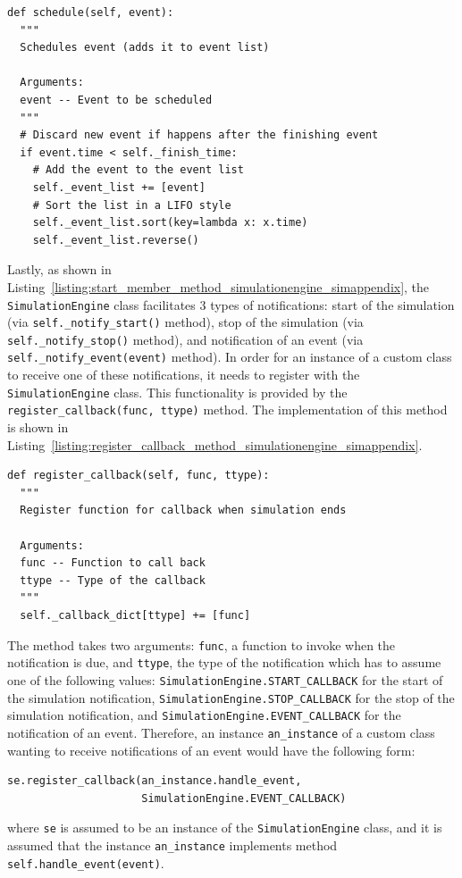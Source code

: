 \begin{lstlisting}[caption=\lstinline{schedule(event)} member method of the \lstinline{SimulationEngine} class, label=listing:schedule_member_method_simulationengine_simappendix]
def schedule(self, event):
  """
  Schedules event (adds it to event list)

  Arguments:
  event -- Event to be scheduled
  """
  # Discard new event if happens after the finishing event
  if event.time < self._finish_time:
    # Add the event to the event list
    self._event_list += [event]
    # Sort the list in a LIFO style
    self._event_list.sort(key=lambda x: x.time)
    self._event_list.reverse()
\end{lstlisting}

Lastly, as shown in Listing~\ref{listing:start_member_method_simulationengine_simappendix}, the \lstinline{SimulationEngine} class facilitates 3 types of notifications: start of the simulation (via \lstinline{self._notify_start()} method), stop of the simulation (via \lstinline{self._notify_stop()} method), and notification of an event (via \lstinline{self._notify_event(event)} method). In order for an instance of a custom class to receive one of these notifications, it needs to register with the \lstinline{SimulationEngine} class. This functionality is provided by the \lstinline{register_callback(func, ttype)} method. The implementation of this method is shown in Listing~\ref{listing:register_callback_method_simulationengine_simappendix}.
\begin{lstlisting}[caption=\lstinline{register_callback(func, ttype)} member method of the \lstinline{SimulationEngine} class, label=listing:register_callback_method_simulationengine_simappendix]
def register_callback(self, func, ttype):
  """
  Register function for callback when simulation ends
  
  Arguments:
  func -- Function to call back
  ttype -- Type of the callback
  """
  self._callback_dict[ttype] += [func]
\end{lstlisting}
The method takes two arguments: \lstinline{func}, a function to invoke when the notification is due, and \lstinline{ttype}, the type of the notification which has to assume one of the following values: \lstinline{SimulationEngine.START_CALLBACK} for the start of the simulation notification, \lstinline{SimulationEngine.STOP_CALLBACK} for the stop of the simulation notification, and \lstinline{SimulationEngine.EVENT_CALLBACK} for the notification of an event. Therefore, an instance \lstinline{an_instance} of a custom class wanting to receive notifications of an event would have the following form:
\begin{lstlisting}[nolol,frame=none,numbers=none]
se.register_callback(an_instance.handle_event,
                     SimulationEngine.EVENT_CALLBACK)
\end{lstlisting}
where \lstinline{se} is assumed to be an instance of the \lstinline{SimulationEngine} class, and it is assumed that the instance \lstinline{an_instance} implements method \lstinline{self.handle_event(event)}.

